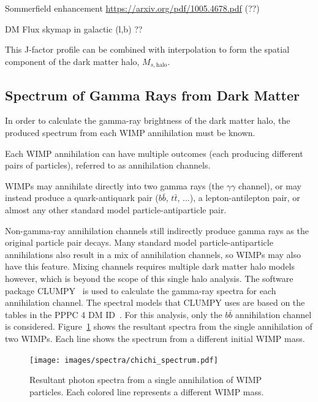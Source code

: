     {\color{red}Sommerfield enhancement \url{https://arxiv.org/pdf/1005.4678.pdf} (??)}

    
    {\color{red}DM Flux skymap in galactic (l,b) ??}
    
    This J-factor profile can be combined with interpolation to form the spatial component of the dark matter halo, $M_{s,\textrm{halo}}$.
    
  \subsection{Spectrum of Gamma Rays from Dark Matter}\label{dm_spectral}
    In order to calculate the gamma-ray brightness of the dark matter halo, the produced spectrum from each WIMP annihilation must be known.

    Each WIMP annihilation can have multiple outcomes (each producing different pairs of particles), referred to as annihilation channels.
    
    WIMPs may annihilate directly into two gamma rays (the $\gamma\gamma$ channel), or may instead produce a quark-antiquark pair ($b\bar{b}$, $t\bar{t}$, ...), a lepton-antilepton pair, or almost any other standard model particle-antiparticle pair.

    Non-gamma-ray annihilation channels still indirectly produce gamma rays as the original particle pair decays.
    Many standard model particle-antiparticle annihilations also result in a mix of annihilation channels, so WIMPs may also have this feature.
    Mixing channels requires multiple dark matter halo models however, which is beyond the scope of this single halo analysis.
    The software package CLUMPY~\cite{CLUMPYcode} is used to calculate the gamma-ray spectra for each annihilation channel.
    The spectral models that CLUMPY uses are based on the tables in the PPPC 4 DM ID~\cite{pppc4_dm_spectra}.
    For this analysis, only the $b\bar{b}$ annihilation channel is considered.
    Figure~\ref{fig:chichi_spectrum} shows the resultant spectra from the single annihilation of two WIMPs.
    Each line shows the spectrum from a different initial WIMP mass.

    \begin{figure}[ht]
      \centering
      \texttt{[image: images/spectra/chichi\_spectrum.pdf]}
      \caption[Single Annihilation Spectra]{
        Resultant photon spectra from a single annihilation of WIMP particles.
        Each colored line represents a different WIMP mass.}
      \label{fig:chichi_spectrum}
    \end{figure}

